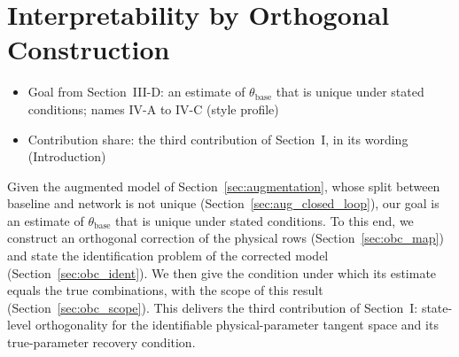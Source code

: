 \section{Interpretability by Orthogonal Construction}\label{sec:obc}
\ifdraft
\begin{itemize}
\item Goal from Section~III-D: an estimate of $\theta_{\mathrm{base}}$ that is unique under stated conditions; names IV-A to IV-C (style profile)
\item Contribution share: the third contribution of Section~I, in its wording (Introduction)
\end{itemize}
\fi

Given the augmented model of Section~\ref{sec:augmentation}, whose split
between baseline and network is not unique (Section~\ref{sec:aug_closed_loop}),
our goal is an estimate of $\theta_{\mathrm{base}}$ that is unique under
stated conditions.
To this end, we construct an orthogonal correction of the physical rows
(Section~\ref{sec:obc_map}) and state the identification problem of the
corrected model (Section~\ref{sec:obc_ident}).
We then give the condition under which its estimate equals the true
combinations, with the scope of this result (Section~\ref{sec:obc_scope}).
This delivers the third contribution of Section~I: state-level orthogonality
for the identifiable physical-parameter tangent space and its true-parameter
recovery condition.

